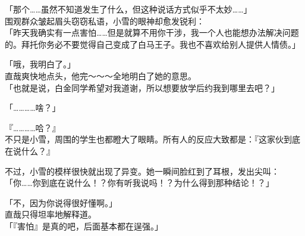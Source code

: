 「那个……虽然不知道发生了什么，但这种说话方式似乎不太妙……」\\

围观群众皱起眉头窃窃私语，小雪的眼神却愈发锐利：\\

「昨天我确实有一点害怕……但是就算不用你干涉，我一个人也能想办法解决问题的。拜托你务必不要觉得自己变成了白马王子。我也不喜欢给别人提供人情债。」

「哦，我明白了。」\\

直哉爽快地点头，他完～～～全地明白了她的意思。\\

「也就是说，白金同学希望对我道谢，所以想要放学后约我到哪里去吧？」

「…………啥？」

『…………哈？』\\

不只是小雪，周围的学生也都瞪大了眼睛。所有人的反应大致都是：『这家伙到底在说什么？』

不过，小雪的模样很快就出现了异变。她一瞬间脸红到了耳根，发出尖叫：\\

「你……你到底在说什么！？你有听我说吗！？为什么得到那种结论！？」

「不，因为你说得很好懂啊。」\\

直哉只得坦率地解释道。\\

「『害怕』是真的吧，后面基本都在逞强。」

